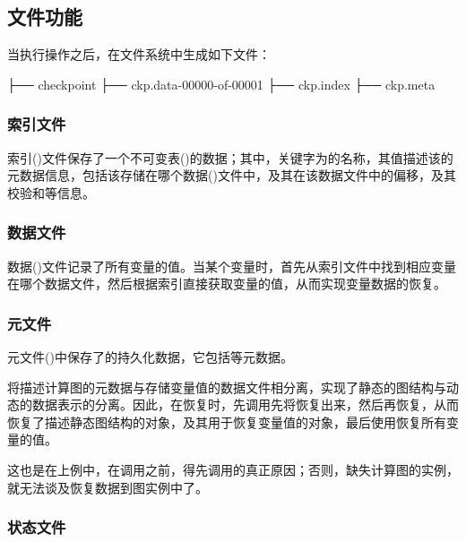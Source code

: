 \begin{content}
\subsection{文件功能}

当执行操作之后，在文件系统中生成如下文件：

\begin{leftbar}
\begin{python}
├── checkpoint
├── ckp.data-00000-of-00001
├── ckp.index
├── ckp.meta
\end{python}
\end{leftbar}

\subsubsection{索引文件}

索引()文件保存了一个不可变表()的数据；其中，关键字为的名称，其值描述该的元数据信息，包括该存储在哪个数据()文件中，及其在该数据文件中的偏移，及其校验和等信息。

\subsubsection{数据文件}

数据()文件记录了所有变量的值。当某个变量时，首先从索引文件中找到相应变量在哪个数据文件，然后根据索引直接获取变量的值，从而实现变量数据的恢复。

\subsubsection{元文件}

元文件()中保存了的持久化数据，它包括等元数据。

将描述计算图的元数据与存储变量值的数据文件相分离，实现了静态的图结构与动态的数据表示的分离。因此，在恢复时，先调用先将恢复出来，然后再恢复，从而恢复了描述静态图结构的对象，及其用于恢复变量值的对象，最后使用恢复所有变量的值。

这也是在上例中，在调用之前，得先调用的真正原因；否则，缺失计算图的实例，就无法谈及恢复数据到图实例中了。

\subsubsection{状态文件}


\end{content}
